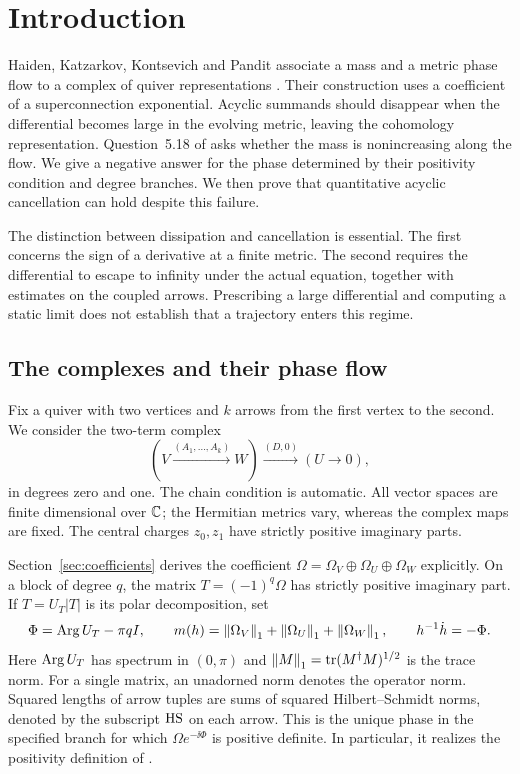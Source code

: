 \section{Introduction}\label{sec:introduction}

Haiden, Katzarkov, Kontsevich and Pandit associate a mass and a metric
phase flow to a complex of quiver representations
\cite[\S\S4.2 and 5.4]{hkkp26}. Their construction uses a coefficient
of a superconnection exponential. Acyclic summands should disappear when
the differential becomes large in the evolving metric, leaving the
cohomology representation. Question~5.18 of \cite{hkkp26} asks whether
the mass is nonincreasing along the flow. We give a negative answer for
the phase determined by their positivity condition and degree branches.
We then prove that quantitative acyclic cancellation can hold despite
this failure.

The distinction between dissipation and cancellation is essential.
The first concerns the sign of a derivative at a finite metric. The
second requires the differential to escape to infinity under the
actual equation, together with estimates on the coupled arrows.
Prescribing a large differential and computing a static limit does not
establish that a trajectory enters this regime.

\subsection{The complexes and their phase flow}
Fix a quiver with two vertices and $k$ arrows from the first vertex to
the second. We consider the two-term complex
\begin{equation}\label{eq:complex}
 (V\xrightarrow{(A_1,\ldots,A_k)}W)
 \xrightarrow{(D,0)}(U\longrightarrow0),
\end{equation}
in degrees zero and one. The chain condition is automatic. All vector
spaces are finite dimensional over $\mathbb C$; the Hermitian metrics vary,
whereas the complex maps are fixed. The central charges $z_0,z_1$ have
strictly positive imaginary parts.

Section~\ref{sec:coefficients} derives the coefficient
$\Omega=\Omega_V\oplus\Omega_U\oplus\Omega_W$ explicitly.
On a block of degree $q$, the matrix $T=(-1)^q\Omega$ has strictly
positive imaginary part. If $T=U_T|T|$ is its polar decomposition, set
\begin{equation}\label{eq:phaseintro}
 \Phi=\operatorname{Arg} U_T-\pi qI,\qquad
 m(h)=\left\lVert\Omega_V\right\rVert_1+\left\lVert\Omega_U\right\rVert_1+\left\lVert\Omega_W\right\rVert_1,
 \qquad h^{-1}\dot h=-\Phi .
\end{equation}
Here $\operatorname{Arg} U_T$ has spectrum in $(0,\pi)$ and
$\left\lVert M\right\rVert_1=\operatorname{tr}(M^\dagger M)^{1/2}$ is the trace norm.
For a single matrix, an unadorned norm denotes the operator norm.
Squared lengths of arrow tuples are sums of squared Hilbert--Schmidt
norms, denoted by the subscript $\mathrm{HS}$ on each arrow.
This is the unique phase in the specified branch for which
$\Omega e^{-\ii\Phi}$ is positive definite. In particular, it realizes
the positivity definition of \cite[\S4.2]{hkkp26}.


